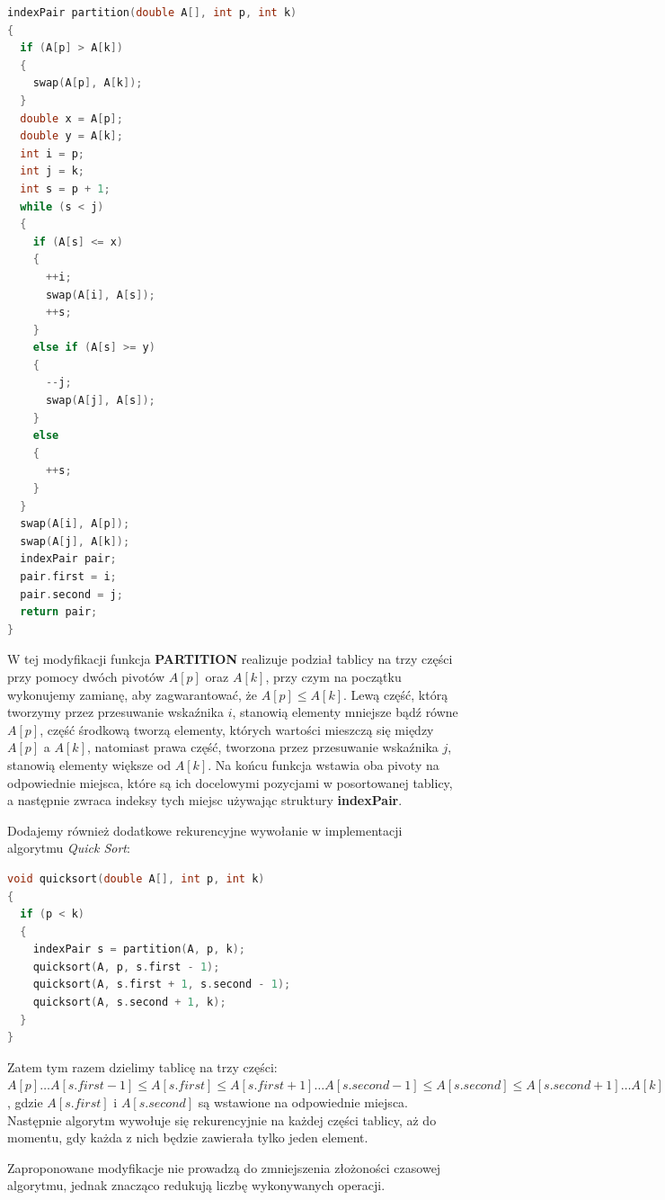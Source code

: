 \documentclass{article}
\begin{document}
\begin{lstlisting}[style=mystyle, language=C++, caption={Implementacja Modyfikacji \texttt{Partition}}, label={lst:partition2}]
indexPair partition(double A[], int p, int k)
{
  if (A[p] > A[k])
  {
    swap(A[p], A[k]);
  }
  double x = A[p];
  double y = A[k];
  int i = p;
  int j = k;
  int s = p + 1;
  while (s < j)
  {
    if (A[s] <= x)
    {
      ++i;
      swap(A[i], A[s]);
      ++s;
    }
    else if (A[s] >= y)
    {
      --j;
      swap(A[j], A[s]);
    }
    else
    {
      ++s;
    }
  }
  swap(A[i], A[p]);
  swap(A[j], A[k]);
  indexPair pair;
  pair.first = i;
  pair.second = j;
  return pair;
}
\end{lstlisting}
W tej modyfikacji funkcja \textbf{PARTITION} realizuje podział tablicy na trzy części przy pomocy dwóch pivotów $A[p]$ oraz $A[k]$, przy czym na początku wykonujemy zamianę, aby zagwarantować, że $A[p] \leq A[k]$. Lewą część, którą tworzymy przez przesuwanie wskaźnika $i$, stanowią elementy mniejsze bądź równe $A[p]$, część środkową tworzą elementy, których wartości mieszczą się między $A[p]$ a $A[k]$, natomiast prawa część, tworzona przez przesuwanie wskaźnika $j$,  stanowią elementy większe od $A[k]$. Na końcu funkcja wstawia oba pivoty na odpowiednie miejsca, które są ich docelowymi pozycjami w posortowanej tablicy, a następnie zwraca indeksy tych miejsc używając struktury \textbf{indexPair}.

\newpage

Dodajemy również dodatkowe rekurencyjne wywołanie w implementacji algorytmu \textit{Quick Sort}:
\begin{lstlisting}[style=mystyle, language=C++, caption={Implementacja Modyfikacji \texttt{Quick Sort}}, label={lst:quick_sort2}]
void quicksort(double A[], int p, int k)
{
  if (p < k)
  {
    indexPair s = partition(A, p, k);
    quicksort(A, p, s.first - 1);
    quicksort(A, s.first + 1, s.second - 1);
    quicksort(A, s.second + 1, k);
  }
}
\end{lstlisting}
Zatem tym razem dzielimy tablicę na trzy części: $A[p] \ldots A[s.first-1] \leq A[s.first] \leq A[s.first+1] \ldots A[s.second-1] \leq A[s.second] \leq A[s.second+1] \ldots A[k]$, gdzie $A[s.first]$ i $A[s.second]$ są wstawione na odpowiednie miejsca. Następnie algorytm wywołuje się rekurencyjnie na każdej części tablicy, aż do momentu, gdy każda z nich będzie zawierała tylko jeden element.

Zaproponowane modyfikacje nie prowadzą do zmniejszenia złożoności czasowej algorytmu, jednak znacząco redukują liczbę wykonywanych operacji.
\end{document}
